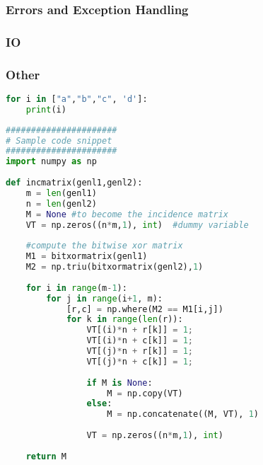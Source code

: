 \subsubsection{Errors and Exception Handling}

\subsubsection{IO}

\subsubsection{Other}

\begin{lstlisting}[language=Python]
for i in ["a","b","c", 'd']:
    print(i)
\end{lstlisting}


\begin{lstlisting}[language=Python]
######################
# Sample code snippet
######################
import numpy as np
 
def incmatrix(genl1,genl2):
    m = len(genl1)
    n = len(genl2)
    M = None #to become the incidence matrix
    VT = np.zeros((n*m,1), int)  #dummy variable
 
    #compute the bitwise xor matrix
    M1 = bitxormatrix(genl1)
    M2 = np.triu(bitxormatrix(genl2),1) 
 
    for i in range(m-1):
        for j in range(i+1, m):
            [r,c] = np.where(M2 == M1[i,j])
            for k in range(len(r)):
                VT[(i)*n + r[k]] = 1;
                VT[(i)*n + c[k]] = 1;
                VT[(j)*n + r[k]] = 1;
                VT[(j)*n + c[k]] = 1;
 
                if M is None:
                    M = np.copy(VT)
                else:
                    M = np.concatenate((M, VT), 1)
 
                VT = np.zeros((n*m,1), int)
 
    return M
\end{lstlisting}

